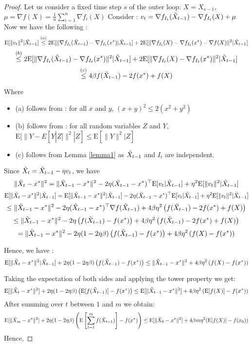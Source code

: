 \documentclass[12pt]{report}
\newcommand{\E}{\mathrm{E}}
\begin{document}
\begin{proof}

Let us consider a fixed time step $s$ of the outer loop: $X=X_{s-1}$, $\mu=\nabla f(X)=\frac{1}{n}\sum_{i=1}^n\nabla f_i(X)$
\newline
Consider : $v_t=\nabla f_{I_t}(\Tilde{X}_{t-1})-\nabla f_{I_t}(X)+\mu$
\newline
Now we have the following :
$$\E[\|v_t\|^2|\Tilde{X}_{t-1}]\overset{(a)}{\leq} 2 \E[\|\nabla f_{I_t}(\Tilde{X}_{t-1})-\nabla f_{I_t}(x^*)|\Tilde{X}_{t-1}]+2\E[\|\nabla f_{I_t}(X)-\nabla f_{I_t}(x^*)-\nabla f(X)\|^2|\Tilde{X}_{t-1}]$$
$$\overset{(b)}{\leq} 2 \E[\|\nabla f_{I_t}(\Tilde{X}_{t-1})-\nabla f_{I_t}(x^*)\|^2|\Tilde{X}_{t-1}]+2\E[\|\nabla f_{I_t}(X)-\nabla f_{I_t}(x^*)\|^2|\Tilde{X}_{t-1}]$$
$$\overset{(c)}{\leq} 4\beta f(\Tilde{X}_{t-1})-2f(x^*)+f(X) $$

Where \begin{itemize}
    \item (a) follows from : for all $x$ and $y$, $(x+y)^2\leq 2(x^2+y^2)$ 
    \item (b) follows from : for all random variables $Z$ and $Y$, $\E[\|Y-E[Y|Z]\|^2|Z]\leq \E\left[\|Y\|^2|Z\right]$
    \item (c) follows from Lemma \ref{lemma1} as $\Tilde{X}_{t-1}$ and $I_t$ are independent.
    
\end{itemize} 
Since $\Tilde{X}_{t}=\Tilde{X}_{t-1}-\eta v_t$, we have
$$\|\Tilde{X}_{t}-x^*\|^2= \|\Tilde{X}_{t-1}-x^*\|^2-2\eta(\Tilde{X}_{t-1}-x^*)^\top \E[v_t|\Tilde{X}_{t-1}]+\eta^2\E[\|v_t\|^2|\Tilde{X}_{t-1}]$$
$$\E[\|\Tilde{X}_{t}-x^*\|^2|\Tilde{X}_{t-1}]=\E[\|\Tilde{X}_{t-1}-x^*\|^2|\Tilde{X}_{t-1}]-2\eta(\Tilde{X}_{t-1}-x^*)^\top\E[v_t|\Tilde{X}_{t-1}]+\eta^2\E[\|v_t\|^2|\Tilde{X}_{t-1}]$$
$$\leq \|\Tilde{X}_{t-1}-x^*\|^2-2\eta(\Tilde{X}_{t-1}-x^*)^\top\nabla f(\Tilde{X}_{t-1})+4\beta\eta^2\left(f(\Tilde{X}_{t-1})-2f(x^*)+f(X)\right) $$
$$\leq \|\Tilde{X}_{t-1}-x^*\|^2-2\eta\left( f(\Tilde{X}_{t-1})-f(x^*)\right)+4\beta \eta^2 \left( f(\Tilde{X}_{t-1})-2f(x^*)+f(X)\right) $$
$$= \|\Tilde{X}_{t-1}-x^*\|^2-2\eta(1-2\eta\beta)\left(f(\Tilde{X}_{t-1})-f(x^*)\right)+4\beta\eta^2\left(f(X)-f(x^*)\right)$$

Hence, we have :
$$\E[\|\Tilde{X}_{t}-x^*\|^2|\Tilde{X}_{t-1}]+2\eta(1-2\eta\beta)\left(f(\Tilde{X}_{t-1})-f(x^*)\right)\leq \|\Tilde{X}_{t-1}-x^*\|^2 +4\beta\eta^2\left(f(X)-f(x^*)\right)$$

Taking the expectation of both sides and applying the tower property we get:
$$\E[\|\Tilde{X}_{t}-x^*\|^2]+2\eta(1-2\eta\beta)\left(\E[f(\Tilde{X}_{t-1})]-f(x^*)\right)\leq \E[\|\Tilde{X}_{t-1}-x^*\|^2] +4\beta\eta^2\left(\E[f(X)]-f(x^*)\right)$$
After summing over $t$ between $1$ and $m$ we obtain:
$$\E[\|\Tilde{X}_m-x^* \|^2]+2\eta(1-2\eta\beta)\left(\E\left[\sum\limits_{t=1}^mf(\Tilde{X}_{t-1})\right]-f(x^*)\right) \leq \E[\|\Tilde{X}_0-x^* \|^2]+4\beta m \eta^2(\E[f(X)]-f(x_0))$$
Hence,


\end{proof}
\end{document}
